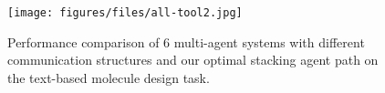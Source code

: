 \begin{figure}[t] 
    \centering
            \texttt{[image: figures/files/all-tool2.jpg]}
    \caption{Performance comparison of 6 multi-agent systems with different communication structures and our optimal stacking agent path on the text-based molecule design task.
    }
    \label{fig:multiagent}
\end{figure}
